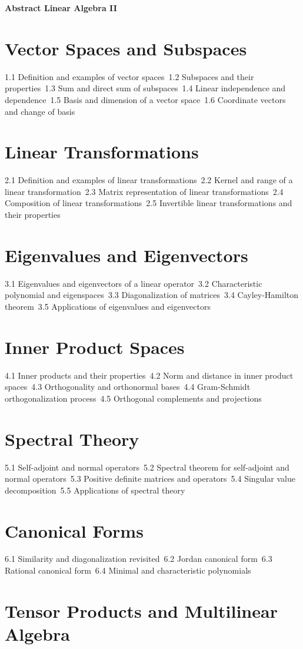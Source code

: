 {\LARGE \bf{Abstract Linear Algebra II}}
\section{Vector Spaces and Subspaces}
1.1 Definition and examples of vector spaces\
1.2 Subspaces and their properties\
1.3 Sum and direct sum of subspaces\
1.4 Linear independence and dependence\
1.5 Basis and dimension of a vector space\
1.6 Coordinate vectors and change of basis\
\section{Linear Transformations}
2.1 Definition and examples of linear transformations\
2.2 Kernel and range of a linear transformation\
2.3 Matrix representation of linear transformations\
2.4 Composition of linear transformations\
2.5 Invertible linear transformations and their properties\
\section{Eigenvalues and Eigenvectors}
3.1 Eigenvalues and eigenvectors of a linear operator\
3.2 Characteristic polynomial and eigenspaces\
3.3 Diagonalization of matrices\
3.4 Cayley-Hamilton theorem\
3.5 Applications of eigenvalues and eigenvectors\
\section{Inner Product Spaces}
4.1 Inner products and their properties\
4.2 Norm and distance in inner product spaces\
4.3 Orthogonality and orthonormal bases\
4.4 Gram-Schmidt orthogonalization process\
4.5 Orthogonal complements and projections\
\section{Spectral Theory}
5.1 Self-adjoint and normal operators\
5.2 Spectral theorem for self-adjoint and normal operators\
5.3 Positive definite matrices and operators\
5.4 Singular value decomposition\
5.5 Applications of spectral theory\
\section{Canonical Forms}
6.1 Similarity and diagonalization revisited\
6.2 Jordan canonical form\
6.3 Rational canonical form\
6.4 Minimal and characteristic polynomials\
\section{Tensor Products and Multilinear Algebra}

